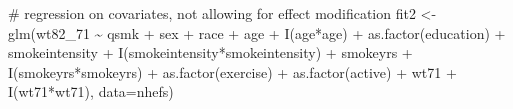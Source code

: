 \documentclass[
  10pt,
  a4paper,
]{book}
\newenvironment{Shaded}{\begin{snugshade}}{\end{snugshade}}
\newcommand{\AttributeTok}[1]{\textcolor[rgb]{0.40,0.45,0.13}{#1}}
\newcommand{\CommentTok}[1]{\textcolor[rgb]{0.37,0.37,0.37}{#1}}
\newcommand{\FunctionTok}[1]{\textcolor[rgb]{0.28,0.35,0.67}{#1}}
\newcommand{\NormalTok}[1]{\textcolor[rgb]{0.00,0.46,0.62}{#1}}
\newcommand{\OtherTok}[1]{\textcolor[rgb]{0.00,0.46,0.62}{#1}}
\newcommand{\SpecialCharTok}[1]{\textcolor[rgb]{0.37,0.37,0.37}{#1}}
\begin{document}
\begin{Shaded}
\begin{Highlighting}[]
\CommentTok{\# regression on covariates, not allowing for effect modification}
\NormalTok{fit2 }\OtherTok{\textless{}{-}} \FunctionTok{glm}\NormalTok{(wt82\_71 }\SpecialCharTok{\textasciitilde{}}\NormalTok{ qsmk }\SpecialCharTok{+}\NormalTok{ sex }\SpecialCharTok{+}\NormalTok{ race }\SpecialCharTok{+}\NormalTok{ age }\SpecialCharTok{+} \FunctionTok{I}\NormalTok{(age}\SpecialCharTok{*}\NormalTok{age) }\SpecialCharTok{+} \FunctionTok{as.factor}\NormalTok{(education)}
           \SpecialCharTok{+}\NormalTok{ smokeintensity }\SpecialCharTok{+} \FunctionTok{I}\NormalTok{(smokeintensity}\SpecialCharTok{*}\NormalTok{smokeintensity) }\SpecialCharTok{+}\NormalTok{ smokeyrs}
           \SpecialCharTok{+} \FunctionTok{I}\NormalTok{(smokeyrs}\SpecialCharTok{*}\NormalTok{smokeyrs) }\SpecialCharTok{+} \FunctionTok{as.factor}\NormalTok{(exercise) }\SpecialCharTok{+} \FunctionTok{as.factor}\NormalTok{(active)}
           \SpecialCharTok{+}\NormalTok{ wt71 }\SpecialCharTok{+} \FunctionTok{I}\NormalTok{(wt71}\SpecialCharTok{*}\NormalTok{wt71), }\AttributeTok{data=}\NormalTok{nhefs)}


\end{Highlighting}
\end{Shaded}
\end{document}
